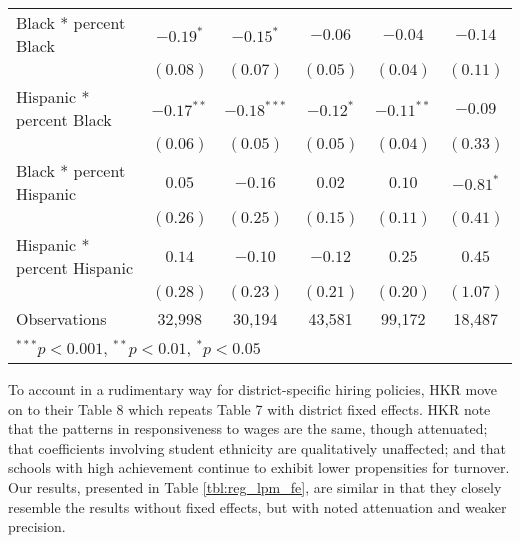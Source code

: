 \documentclass[12pt,]{article}
\begin{document}
\begin{sidewaystable}
\begin{center}
\begin{tabular}{l c c c c c }
\quad Black * percent Black                 & $-0.19^{*}$  & $-0.15^{*}$   & $-0.06$     & $-0.04$      & $-0.14$      \\
                                            & $(0.08)$     & $(0.07)$      & $(0.05)$    & $(0.04)$     & $(0.11)$     \\
\quad Hispanic * percent Black              & $-0.17^{**}$ & $-0.18^{***}$ & $-0.12^{*}$ & $-0.11^{**}$ & $-0.09$      \\
                                            & $(0.06)$     & $(0.05)$      & $(0.05)$    & $(0.04)$     & $(0.33)$     \\
\quad Black * percent Hispanic              & $0.05$       & $-0.16$       & $0.02$      & $0.10$       & $-0.81^{*}$  \\
                                            & $(0.26)$     & $(0.25)$      & $(0.15)$    & $(0.11)$     & $(0.41)$     \\
\quad Hispanic * percent Hispanic           & $0.14$       & $-0.10$       & $-0.12$     & $0.25$       & $0.45$       \\
                                            & $(0.28)$     & $(0.23)$      & $(0.21)$    & $(0.20)$     & $(1.07)$     \\
\hline
Observations                                & 32,998        & 30,194         & 43,581       & 99,172        & 18,487        \\
\hline
\multicolumn{6}{l}{\scriptsize{$^{***}p<0.001$, $^{**}p<0.01$, $^*p<0.05$}}
\end{tabular}
\caption{Estimated Effects of Starting Teacher Salary and Student Demographic Characteristics on the Probability that Teachers Leave School Districts with District Fixed Effects, by Experience (linear probability models; Huber-White standard errors in parentheses)}
\label{tbl:reg_lpm_fe}
\end{center}
\end{sidewaystable}

To account in a rudimentary way for district-specific hiring policies,
HKR move on to their Table 8 which repeats Table 7 with district fixed
effects. HKR note that the patterns in responsiveness to wages are the
same, though attenuated; that coefficients involving student ethnicity
are qualitatively unaffected; and that schools with high achievement
continue to exhibit lower propensities for turnover. Our results,
presented in Table \ref{tbl:reg_lpm_fe}, are similar in that they
closely resemble the results without fixed effects, but with noted
attenuation and weaker precision.
\end{document}
